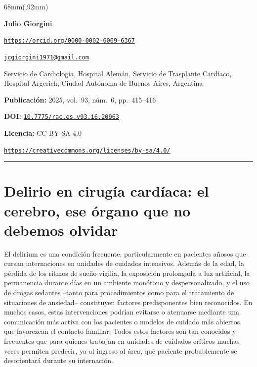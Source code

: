 \documentclass{article}
\newlength{\gbbloquex}
\begin{document}
\begin{textblock*}{68mm}(\gbbloquex,92mm)
{\setlength{\leftskip}{0pt}\setlength{\parindent}{0pt}%
\noindent\begin{minipage}[t]{68mm}
\sffamily\small\setlength{\parskip}{1pt}
{\bfseries\color{azulrevista}Julio Giorgini}\par
{\scriptsize\texttt{\href{https://orcid.org/0000-0002-6069-6367}{https://orcid.org/0000-0002-6069-6367}}}\par
{\scriptsize\texttt{\href{mailto:jcgiorgini1971@gmail.com}{jcgiorgini1971@gmail.com}}}\par
Servicio de Cardiología, Hospital Alemán, Servicio de Trasplante Cardíaco, Hospital Argerich, Ciudad Autónoma de Buenos Aires, Argentina\par
\vspace{6pt}
{\bfseries\color{azulrevista!70}Publicación:} 2025, vol.~93, n\'um.~6, pp.~415--416\par\vspace{6pt}
{\bfseries\color{azulrevista!70}DOI:} {\scriptsize\texttt{\href{https://doi.org/10.7775/rac.es.v93.i6.20963}{10.7775/rac.es.v93.i6.20963}}}\par\vspace{6pt}
{\bfseries\color{azulrevista!70}Licencia:} CC BY-SA 4.0\par
{\scriptsize\texttt{\href{https://creativecommons.org/licenses/by-sa/4.0/}{https://creativecommons.org/licenses/by-sa/4.0/}}}\par
\vspace{6pt}
\end{minipage}%
}%
\end{textblock*}


\bigskip
\noindent\rule{\linewidth}{0.4pt}
\bigskip

\section{Delirio en cirugía cardíaca: el cerebro, ese órgano que no debemos olvidar}
El delirium es una condición frecuente, particularmente en pacientes añosos que cursan internaciones en unidades de cuidados intensivos. Además de la edad, la pérdida de los ritmos de sueño-vigilia, la exposición prolongada a luz artificial, la permanencia durante días en un ambiente monótono y despersonalizado, y el uso de drogas sedantes –tanto para procedimientos como para el tratamiento de situaciones de ansiedad– constituyen factores predisponentes bien reconocidos. En muchos casos, estas intervenciones podrían evitarse o atenuarse mediante una comunicación más activa con los pacientes o modelos de cuidado más abiertos, que favorezcan el contacto familiar. Todos estos factores son tan conocidos y frecuentes que para quienes trabajan en unidades de cuidados críticos muchas veces permiten predecir, ya al ingreso al área, qué paciente probablemente se desorientará durante su internación.
\end{document}
